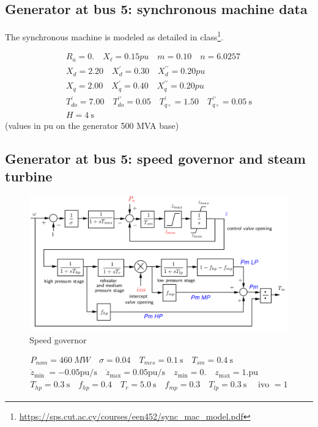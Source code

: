 \documentclass[a4paper,11pt,oneside,onecolumn]{article}
\begin{document}
\subsection{Generator at bus 5: synchronous machine data}

The synchronous machine is modeled as detailed in class\footnote{\url{https://sps.cut.ac.cy/courses/een452/sync_mac_model.pdf}}.

$$
\begin{gathered}
	R_a=0 . \quad X_{\ell}=0.15 p u \quad m=0.10 \quad n=6.0257 \\
	X_d=2.20 \quad X_d^{\prime}=0.30 \quad X_d^{\prime \prime}=0.20 p u \\
	X_q=2.00 \quad X_q^{\prime}=0.40 \quad X_q^{\prime \prime}=0.20 p u \\
	T_{d o}^{\prime}=7.00 \quad T_{d o}^{\prime \prime}=0.05 \quad T_{q \circ}^{\prime}=1.50 \quad T_{q \circ}^{\prime \prime}=0.05 \mathrm{~s} \\
	H=4 \mathrm{~s}
\end{gathered}
$$
(values in pu on the generator 500 MVA base)


\subsection{Generator at bus 5: speed governor and steam turbine}

\begin{figure}[H]
	\centering
	\includegraphics[width=1\linewidth]{governor}
	\caption{Speed governor}
	\label{fig:governor}
\end{figure}

$$
\begin{gathered}
	P_{nom}=460\ MW \quad \sigma=0.04 \quad T_{m e s}=0.1 \mathrm{~s} \quad T_{s m}=0.4 \mathrm{~s} \\
	\dot{z}_{\text {min }}=-0.05 \mathrm{pu} / \mathrm{s} \quad \dot{z}_{\max }=0.05 \mathrm{pu} / \mathrm{s} \quad z_{\min }=0 . \quad z_{\max }=1 . \mathrm{pu} \\
	T_{h p}=0.3 \mathrm{~s} \quad f_{h p}=0.4 \quad T_r=5.0 \mathrm{~s} \quad f_{m p}=0.3 \quad T_{l p}=0.3 \mathrm{~s} \quad \text { ivo }=1
\end{gathered}
$$
\end{document}
